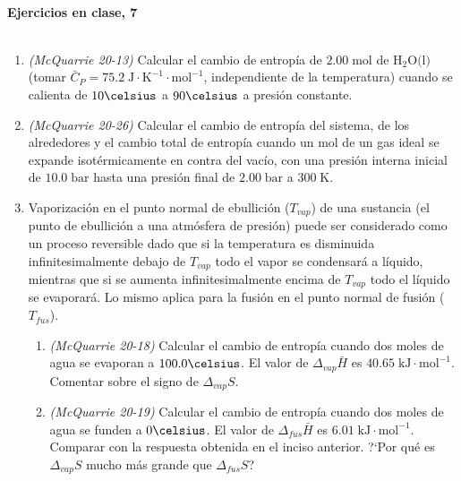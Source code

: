 \documentclass[a4paper,12pt]{article}
\begin{document}

\begin{center}
\HRule \\[0.4cm]
{ \bfseries Ejercicios en clase, 7}\\ %
\HRule \\[0.4cm]
\end{center}


\begin{enumerate}

 \item \textit{(McQuarrie 20-13)} Calcular el cambio de entrop\'ia de $2.00\;\mbox{mol}$ de $\mbox{H}_2\mbox{O(l)}$ (tomar $\bar{C}_P=75.2\;\mbox{J}\cdot\mbox{K}^{-1}\cdot\mbox{mol}^{-1}$, independiente de la temperatura) cuando se calienta de $10\celsius$ a $90\celsius$ a presi\'on constante. %

 \item \textit{(McQuarrie 20-26)} Calcular el cambio de entrop\'ia del sistema, de los alrededores y el cambio total de entrop\'ia cuando un mol de un gas ideal se expande isot\'ermicamente en contra del vac\'io, con una presi\'on interna inicial de $10.0\;\mbox{bar}$ hasta una presi\'on final de $2.00\;\mbox{bar}$ a $300\;\mbox{K}$. %

 \item Vaporizaci\'on en el punto normal de ebullici\'on ($T_{vap}$) de una sustancia (el punto de ebullici\'on a una atm\'osfera de presi\'on) puede ser considerado como un proceso reversible dado que si la temperatura es disminuida infinitesimalmente debajo de $T_{vap}$ todo el vapor se condensar\'a a l\'iquido, mientras que si se aumenta infinitesimalmente encima de $T_{vap}$ todo el l\'iquido se evaporar\'a. Lo mismo aplica para la fusi\'on en el punto normal de fusi\'on ($T_{fus}$). 
\begin{enumerate}
 \item \textit{(McQuarrie 20-18)} Calcular el cambio de entrop\'ia cuando dos moles de agua se evaporan a $100.0\celsius$. El valor de $\Delta_{vap}\bar{H}$ es $40.65\;\mbox{kJ}\cdot\mbox{mol}^{-1}$. Comentar sobre el signo de $\Delta_{vap}S$. %

 \item \textit{(McQuarrie 20-19)} Calcular el cambio de entrop\'ia cuando dos moles de agua se funden a $0\celsius$. El valor de $\Delta_{fus}\bar{H}$ es $6.01\;\mbox{kJ}\cdot\mbox{mol}^{-1}$. Comparar con la respuesta obtenida en el inciso anterior. ?`Por qu\'e es $\Delta_{vap}S$ mucho m\'as grande que $\Delta_{fus}S$? %
\end{enumerate}


\end{enumerate}
\end{document}
